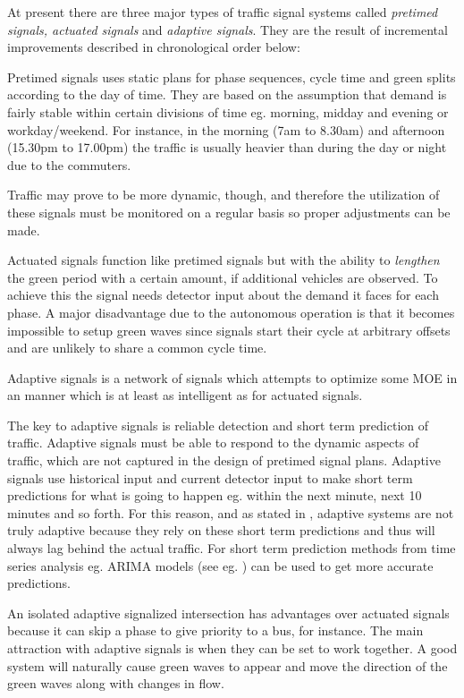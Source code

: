 \label{sec:signal_types}

At present there are three major types of traffic signal systems
called {\em pretimed signals, actuated signals} and {\em adaptive
signals}. They are the result of incremental improvements described in
chronological order below:

Pretimed signals uses static plans for phase sequences, cycle time and
green splits according to the day of time.
\label{insec:pretimed}
They are based on the assumption that demand is fairly stable within
certain divisions of time eg. morning, midday and evening or
workday/weekend. For instance, in the morning (7am to 8.30am) and
afternoon (15.30pm to 17.00pm) the traffic is usually heavier than
during the day or night due to the commuters.

Traffic may prove to be more dynamic, though, and therefore the
utilization of these signals must be monitored on a regular basis so
proper adjustments can be made.

Actuated signals function like pretimed signals but with the ability
to \textit{lengthen} the green period with a certain amount, if
additional vehicles are observed.
\label{insec:actuated}
To achieve this the signal needs detector input about the demand it
faces for each phase.  A major disadvantage due to the autonomous
operation is that it becomes impossible to setup green waves since
signals start their cycle at arbitrary offsets and are unlikely to
share a common cycle time.

Adaptive signals is a network of signals which attempts to
optimize some MOE in an manner which is at least as intelligent as for
actuated signals.

The key to adaptive signals is reliable detection and short term
prediction of traffic. Adaptive signals must be able to respond to the
dynamic aspects of traffic, which are not captured in the design of
pretimed signal plans. Adaptive signals use historical input and
current detector input to make short term predictions for what is
going to happen eg. within the next minute, next 10 minutes and so
forth. For this reason, and as stated in \cite{1}, adaptive systems
are not truly adaptive because they rely on these short term
predictions and thus will always lag behind the actual traffic. For
short term prediction methods from time series analysis eg. ARIMA
models (see eg. \cite{shortpredict}) can be used to get more accurate
predictions.

An isolated adaptive signalized intersection has advantages over
actuated signals because it can skip a phase to give priority to a
bus, for instance. The main attraction with adaptive signals is when
they can be set to work together. A good system will naturally cause
green waves to appear and move the direction of the green waves along
with changes in flow.
